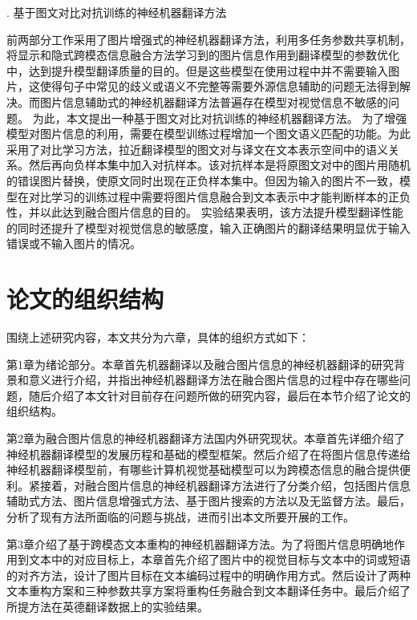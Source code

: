 {. 基于图文对比对抗训练的神经机器翻译方法}

前两部分工作采用了图片增强式的神经机器翻译方法，利用多任务参数共享机制，将显示和隐式跨模态信息融合方法学习到的图片信息作用到翻译模型的参数优化中，达到提升模型翻译质量的目的。但是这些模型在使用过程中并不需要输入图片，这使得句子中常见的歧义或语义不完整等需要外源信息辅助的问题无法得到解决。而图片信息辅助式的神经机器翻译方法普遍存在模型对视觉信息不敏感的问题。
为此，本文提出一种基于图文对比对抗训练的神经机器翻译方法。
为了增强模型对图片信息的利用，需要在模型训练过程增加一个图文语义匹配的功能。为此采用了对比学习方法，拉近翻译模型的图文对与译文在文本表示空间中的语义关系。然后再向负样本集中加入对抗样本。该对抗样本是将原图文对中的图片用随机的错误图片替换，使原文同时出现在正负样本集中。但因为输入的图片不一致，模型在对比学习的训练过程中需要将图片信息融合到文本表示中才能判断样本的正负性，并以此达到融合图片信息的目的。
实验结果表明，该方法提升模型翻译性能的同时还提升了模型对视觉信息的敏感度，输入正确图片的翻译结果明显优于输入错误或不输入图片的情况。


\section{论文的组织结构}

围绕上述研究内容，本文共分为六章，具体的组织方式如下：

第1章为绪论部分。本章首先机器翻译以及融合图片信息的神经机器翻译的研究背景和意义进行介绍，并指出神经机器翻译方法在融合图片信息的过程中存在哪些问题，随后介绍了本文针对目前存在问题所做的研究内容，最后在本节介绍了论文的组织结构。

第2章为融合图片信息的神经机器翻译方法国内外研究现状。本章首先详细介绍了神经机器翻译模型的发展历程和基础的模型框架。然后介绍了在将图片信息传递给神经机器翻译模型前，有哪些计算机视觉基础模型可以为跨模态信息的融合提供便利。紧接着，对融合图片信息的神经机器翻译方法进行了分类介绍，包括图片信息辅助式方法、图片信息增强式方法、基于图片搜索的方法以及无监督方法。最后，分析了现有方法所面临的问题与挑战，进而引出本文所要开展的工作。

第3章介绍了基于跨模态文本重构的神经机器翻译方法。为了将图片信息明确地作用到文本中的对应目标上，本章首先介绍了图片中的视觉目标与文本中的词或短语的对齐方法，设计了图片目标在文本编码过程中的明确作用方式。然后设计了两种文本重构方案和三种参数共享方案将重构任务融合到文本翻译任务中。最后介绍了所提方法在英德翻译数据上的实验结果。

